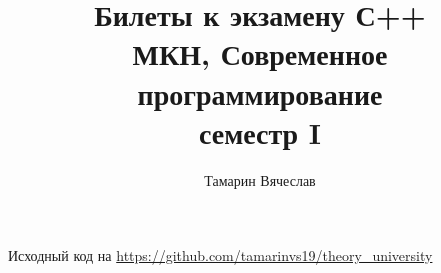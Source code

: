 \documentclass[11pt,dvipsnames]{report}
\title{Билеты к экзамену С++ \\ 
    МКН, Современное программирование \\
     семестр I
 }
\author{Тамарин Вячеслав}
\date{\displaydate{date}}
\begin{document}
\maketitle
\tableofcontents

\hspace{1em}
\center Исходный код на \url{https://github.com/tamarinvs19/theory_university}

%  
\newpage  
\newpage  
\newpage  
\newpage  
\newpage  
\newpage  
\newpage  
\newpage  
\newpage  
\newpage  
\newpage  
\newpage  
\newpage  
\newpage  
\newpage  
\newpage  
\newpage  
\newpage  
\newpage  
\end{document}
